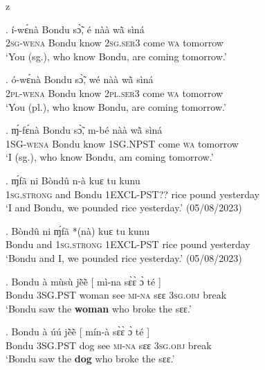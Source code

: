 z   \documentclass{assets/fieldnotes}
\begin{document}
\exg. í-wɛ́nà Bondu sɔ̃̀, é nàà wã̀ sìná\\
\textsc{2sg}-\textsc{wena} Bondu know \textsc{2sg.ser3} come \textsc{wa} tomorrow\\
`You (sg.), who know Bondu, are coming tomorrow.’

\exg. ó-wɛ́nà Bondu sɔ̃̀, wé nàà wã̀ sìná\\
\textsc{2pl}-\textsc{wena} Bondu know \textsc{2pl.ser3} come \textsc{wa} tomorrow\\
`You (pl.), who know Bondu, are coming tomorrow.’

\exg. ɱ́-fɛ́nà Bondu sɔ̃̀, m-bé nàà wã̀ sìná\\
\textsc{1SG}-\textsc{wena} Bondu know \textsc{1SG.NPST} come \textsc{wa} tomorrow\\
`I (sg.), who know Bondu, am coming tomorrow.’

\exg.  ɱ́fã ni Bòndû n-à kuɛ tu kunu\\
1\textsc{sg.strong} and Bondu 1\textsc{EXCL-PST??} rice pound yesterday\\
`I and Bondu, we pounded rice yesterday.' (05/08/2023)

\exg.  Bòndû ni ɱ́fã *(nà) kuɛ tu kunu\\
Bondu and 1\textsc{sg.strong} 1\textsc{EXCL-PST} rice pound yesterday\\
`Bondu and I, we pounded rice yesterday.' (05/08/2023)






\exg. Bondu à mùsù jẽ̀ẽ̀ {[} mì-na sɛ̀ɛ̀ ɔ̀ té {]}\\
Bondu \textsc{3SG.PST} woman see {} \textsc{mi-na} sɛɛ \textsc{3sg.obj} break {}\\
`Bondu saw the \textbf{woman} who broke the sɛɛ.’

\exg. Bondu à úú jẽ̀ẽ̀ {[} mín-à sɛ̀ɛ̀ ɔ̀ té {]}\\
Bondu \textsc{3SG.PST} dog see {} \textsc{mi-na} sɛɛ \textsc{3sg.obj} break {}\\
`Bondu saw the \textbf{dog} who broke the sɛɛ.’
\end{document}
